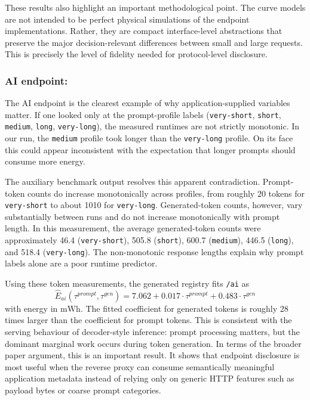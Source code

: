 These results also highlight an important methodological point. The curve models are not intended to be perfect physical simulations of the endpoint implementations. Rather, they are compact interface-level abstractions that preserve the major decision-relevant differences between small and large requests. This is precisely the level of fidelity needed for protocol-level disclosure.

\subsubsection{AI endpoint:} The AI endpoint is the clearest example of why application-supplied variables matter. If one looked only at the prompt-profile labels (\texttt{very-short}, \texttt{short}, \texttt{medium}, \texttt{long}, \texttt{very-long}), the measured runtimes are not strictly monotonic. In our run, the \texttt{medium} profile took longer than the \texttt{very-long} profile. On its face this could appear inconsistent with the expectation that longer prompts should consume more energy.

The auxiliary benchmark output resolves this apparent contradiction. Prompt-token counts do increase monotonically across profiles, from roughly 20 tokens for \texttt{very-short} to about 1010 for \texttt{very-long}. Generated-token counts, however, vary substantially between runs and do not increase monotonically with prompt length. In this measurement, the average generated-token counts were approximately 46.4 (\texttt{very-short}), 505.8 (\texttt{short}), 600.7 (\texttt{medium}), 446.5 (\texttt{long}), and 518.4 (\texttt{very-long}). The non-monotonic response lengths explain why prompt labels alone are a poor runtime predictor.

Using these token measurements, the generated registry fits \texttt{/ai} as
\[
\widehat{E}_{ai}(\tau^{prompt}, \tau^{gen}) =
7.062 + 0.017 \cdot \tau^{prompt} + 0.483 \cdot \tau^{gen}
\]
with energy in \(\mathrm{mWh}\). The fitted coefficient for generated tokens is roughly 28 times larger than the coefficient for prompt tokens. This is consistent with the serving behaviour of decoder-style inference: prompt processing matters, but the dominant marginal work occurs during token generation. In terms of the broader paper argument, this is an important result. It shows that endpoint disclosure is most useful when the reverse proxy can consume semantically meaningful application metadata instead of relying only on generic HTTP features such as payload bytes or coarse prompt categories.

